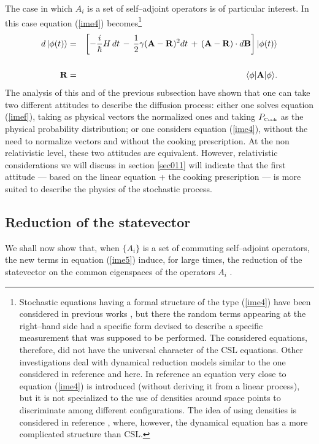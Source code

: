 \documentclass[12pt]{article}
\begin{document}
The case in which $A_{i}$ is a set of self--adjoint operators is
of particular interest. In this case equation (\ref{ime4})
becomes\footnote{Stochastic equations having a formal structure of
the type (\ref{ime4}) have been considered in previous works
\cite{gis1,pea1}, but there the random terms appearing at the
right--hand side had a specific form devised to describe a
specific measurement that was supposed to be performed. The
considered equations, therefore, did not have the universal
character of the CSL equations. Other investigations
\cite{gisfl,di1,di2} deal with dynamical reduction models similar
to the one considered in reference \cite{csl0} and here. In
reference \cite{di1} an equation very close to equation
(\ref{ime4}) is introduced (without deriving it from a linear
process), but it is not specialized to the use of densities around
space points to discriminate among different configurations. The
idea of using densities is considered in reference \cite{di2},
where, however, the dynamical equation has a more complicated
structure than CSL.}
\begin{eqnarray} \label{ime5}
d\, |\phi(t)\rangle & = & \left[-\frac{i}{\hbar} H\, dt \, - \,
\frac{1}{2}\gamma ({\bf A} - {\bf R})^{2}  dt \, + \, ( {\bf A} -
{\bf R})\cdot d{\bf B}
\right] |\phi(t)\rangle \nonumber \\
& & \nonumber \\
{\bf R} & = &  \langle \phi|{\bf A}|\phi \rangle.
\end{eqnarray}
The analysis of this and of the previous subsection have shown
that one can take two different attitudes to describe the
diffusion process: either one solves equation (\ref{imef}), taking
as physical vectors the normalized ones and taking
$P_{\makebox{\tiny Cook}}$ as the physical probability
distribution; or one considers equation (\ref{ime4}), without the
need to normalize vectors and without the cooking prescription. At
the non relativistic level, these two attitudes are equivalent.
However, relativistic considerations we will discuss in section
\ref{sec011} will indicate that the first attitude
--- based on the linear equation + the cooking prescription --- is
more suited to describe the physics of the stochastic process.


\subsection{Reduction of the statevector} \label{sec63}

We shall now show that, when $\{A_{i}\}$ is a set of commuting
self--adjoint operators, the new terms in equation (\ref{ime5})
induce, for large times, the reduction of the statevector on the
common eigenspaces of the operators $A_{i}$ \cite{csl}.
\end{document}
